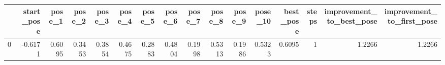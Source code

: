 \begin{tabular}{lrrrrrrrrrrrrrrr}
\toprule
{} &  start\_pose &  pose\_1 &  pose\_2 &  pose\_3 &  pose\_4 &  pose\_5 &  pose\_6 &  pose\_7 &  pose\_8 &  pose\_9 &  pose\_10 &  best\_pose &  steps &  improvement\_to\_best\_pose &  improvement\_to\_first\_pose \\
\midrule
0 &     -0.6171 &  0.6095 &  0.3453 &  0.3854 &  0.4675 &  0.2883 &  0.4804 &  0.1998 &  0.5313 &  0.1986 &   0.5323 &     0.6095 &      1 &                    1.2266 &                     1.2266 \\
\bottomrule
\end{tabular}

